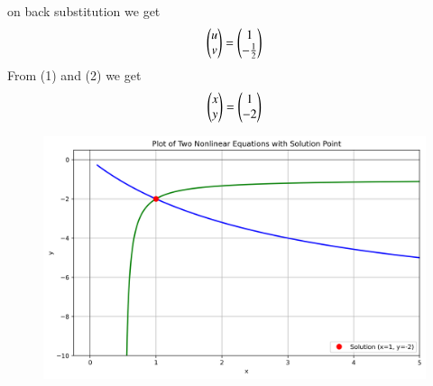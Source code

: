 \documentclass[journal]{IEEEtran}
\begin{document}
on back substitution we get 
\begin{align}
    \begin{pmatrix}u\\v\end{pmatrix}=\begin{pmatrix}1\\-\frac{1}{2}\end{pmatrix}
\end{align}
From (1) and (2) we get
\begin{align}
    \begin{pmatrix}x\\y\end{pmatrix}=\begin{pmatrix}1\\-2\end{pmatrix}
\end{align}
\begin{figure}
    \centering
    \includegraphics[width=0.85\columnwidth]{figs/01.png}
    \caption{}
    \label{fig:placeholder}
\end{figure}
\end{document}
